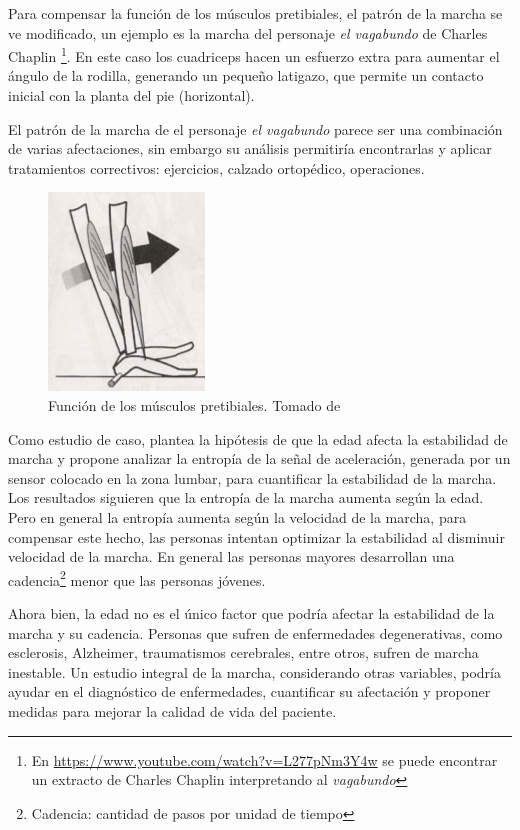 Para compensar la función de los músculos pretibiales, el patrón de la marcha se ve modificado, un ejemplo es la marcha del personaje \emph{el vagabundo} de Charles Chaplin \footnote{En \url{https://www.youtube.com/watch?v=L277pNm3Y4w} se puede encontrar un extracto de Charles Chaplin interpretando al \emph{vagabundo}}. En este caso los cuadriceps hacen un esfuerzo extra para aumentar el ángulo de la rodilla, generando un pequeño latigazo, que permite un contacto inicial con la planta del pie (horizontal).

El patrón de la marcha de el personaje \emph{el vagabundo} parece ser una combinación de varias afectaciones, sin embargo su análisis permitiría encontrarlas y aplicar tratamientos correctivos: ejercicios, calzado ortopédico, operaciones. 

\begin{figure}
    \centering
    \includegraphics[width=0.2\textheight]{imagenes/heel_rocker}
    \caption{Función de los músculos pretibiales. Tomado de \citep{perry}}
    \label{fig:heel_rocker}
\end{figure}

Como estudio de caso, \cite{arif} plantea la hipótesis de que la edad afecta la estabilidad de marcha y propone analizar la entropía de la señal de aceleración, generada por un sensor colocado en la zona lumbar, para cuantificar la estabilidad de la marcha. Los resultados siguieren que la entropía de la marcha aumenta según la edad. Pero en general la entropía aumenta según la velocidad de la marcha, para compensar este hecho, las personas intentan optimizar la estabilidad al disminuir velocidad de la marcha. En general las personas mayores desarrollan una cadencia\footnote{Cadencia: cantidad de pasos por unidad de tiempo} menor que las personas jóvenes. 

Ahora bien, la edad no es el único factor que podría afectar la estabilidad de la marcha y su cadencia. Personas que sufren de enfermedades degenerativas, como esclerosis, Alzheimer, traumatismos cerebrales, entre otros, sufren de marcha inestable. Un estudio integral de la marcha, considerando otras variables, podría ayudar en el diagnóstico de enfermedades, cuantificar su afectación y proponer medidas para mejorar la calidad de vida del paciente. 


